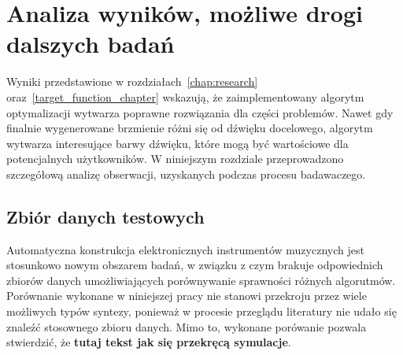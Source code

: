 \chapter{Analiza wyników, możliwe drogi dalszych badań}\label{chap:results_analysis}



Wyniki przedstawione w rozdziałach~\ref{chap:research} oraz~\ref{target_function_chapter}
wskazują, że zaimplementowany algorytm optymalizacji wytwarza poprawne rozwiązania
dla części problemów. Nawet gdy finalnie wygenerowane brzmienie różni
się od dźwięku docelowego, algorytm wytwarza interesujące barwy dźwięku,
które mogą być wartościowe dla potencjalnych użytkowników.
W niniejszym rozdziale przeprowadzono szczegółową analizę obserwacji,
uzyskanych podczas procesu badawaczego.

\section{Zbiór danych testowych} \label{sec:not_enough_benchmarking_data}


Automatyczna konstrukcja elektronicznych instrumentów muzycznych jest stosunkowo
nowym obszarem badań, w związku z czym brakuje odpowiednich zbiorów danych
umożliwiających porównywanie sprawności różnych algorutmów.
Porównanie wykonane w niniejszej pracy nie stanowi przekroju
przez wiele możliwych typów syntezy, ponieważ w procesie przeglądu
literatury nie udało się znaleźć stosownego zbioru danych. Mimo
to, wykonane porówanie pozwala stwierdzić, że
\textbf{tutaj tekst jak się przekręcą symulacje}.


